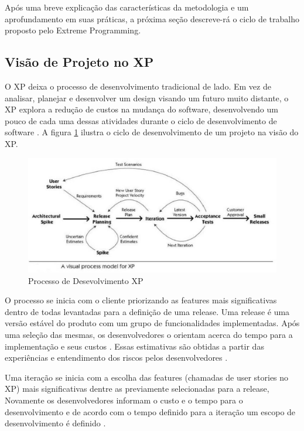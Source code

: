 Após uma breve explicação das características da metodologia e um aprofundamento em suas práticas, a próxima seção descreve-rá o ciclo de trabalho proposto pelo Extreme Programming.

\subsection{Visão de Projeto no XP}

O XP deixa o processo de desenvolvimento tradicional de lado. Em vez de analisar, planejar e desenvolver um design visando um futuro muito distante, o XP explora a redução de custos na mudança do software, desenvolvendo um pouco de cada uma dessas atividades durante o ciclo de desenvolvimento de software \cite{Beck:1999}. A figura \ref{fig03} ilustra o ciclo de desenvolvimento de um projeto na visão do XP.

\begin{figure}[h]
	\centering
	\includegraphics[keepaspectratio=true,scale=0.9]{figuras/fig03.eps}
	\caption{Processo de Desevolvimento XP \cite{Process}}
	\label{fig03}
\end{figure}

O processo se inicia com o cliente priorizando as features mais significativas dentro de todas levantadas para a definição de uma release. Uma release é uma versão estável do produto com um grupo de funcionalidades implementadas. Após uma seleção das mesmas, os desenvolvedores o orientam acerca do tempo para a implementação e seus custos \cite{Beck:1999}. Essas estimativas são obtidas a partir das experiências e entendimento dos riscos pelos desenvolvedores \cite{Bernabe:2015}.

Uma iteração se inicia com a escolha das features (chamadas de user stories no XP) mais significativas dentre as previamente selecionadas para a release, Novamente os desenvolvedores informam o custo e o tempo para o desenvolvimento e de acordo com o tempo definido para a iteração um escopo de desenvolvimento é definido \cite{Beck:1999}.

